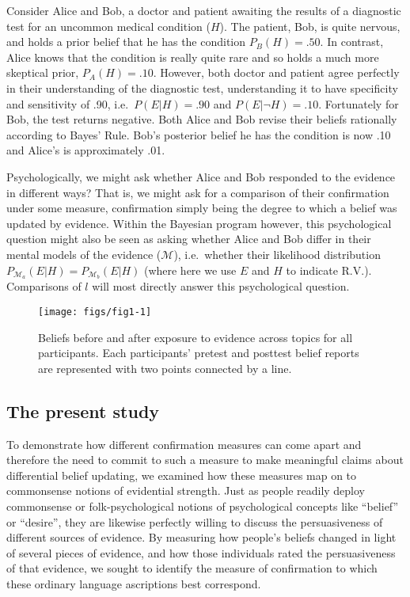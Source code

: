 \documentclass[10pt, letterpaper]{article}
\newenvironment{CodeChunk}{}{}
\begin{document}
Consider Alice and Bob, a doctor and patient awaiting the results of a
diagnostic test for an uncommon medical condition (\(H\)). The patient,
Bob, is quite nervous, and holds a prior belief that he has the
condition \(P_{B}(H) = .50\). In contrast, Alice knows that the
condition is really quite rare and so holds a much more skeptical prior,
\(P_{A}(H) = .10\). However, both doctor and patient agree perfectly in
their understanding of the diagnostic test, understanding it to have
specificity and sensitivity of .90, i.e.~\(P(E|H) = .90\) and
\(P(E| \neg H) =. 10\). Fortunately for Bob, the test returns negative.
Both Alice and Bob revise their beliefs rationally according to Bayes'
Rule. Bob's posterior belief he has the condition is now .10 and Alice's
is approximately .01.

Psychologically, we might ask whether Alice and Bob responded to the
evidence in different ways? That is, we might ask for a comparison of
their confirmation under some measure, confirmation simply being the
degree to which a belief was updated by evidence. Within the Bayesian
program however, this psychological question might also be seen as
asking whether Alice and Bob differ in their mental models of the
evidence (\(\mathcal{M}\)), i.e.~whether their likelihood distribution
\(P_{\mathcal{M}_a}(E|H) = P_{\mathcal{M}_b}(E|H)\) (where here we use
\(E\) and \(H\) to indicate R.V.). Comparisons of \(l\) will most
directly answer this psychological question.

\begin{CodeChunk}
\begin{figure*}[!ht]
\texttt{[image: figs/fig1-1]} \caption[Beliefs before and after exposure to evidence across topics for all participants]{Beliefs before and after exposure to evidence across topics for all participants. Each participants' pretest and posttest belief reports are represented with two points connected by a line.}\label{fig:fig1}
\end{figure*}
\end{CodeChunk}

\hypertarget{the-present-study}{%
\subsection{The present study}\label{the-present-study}}

To demonstrate how different confirmation measures can come apart and
therefore the need to commit to such a measure to make meaningful claims
about differential belief updating, we examined how these measures map
on to commonsense notions of evidential strength. Just as people readily
deploy commonsense or folk-psychological notions of psychological
concepts like ``belief'' or ``desire'', they are likewise perfectly
willing to discuss the persuasiveness of different sources of evidence.
By measuring how people's beliefs changed in light of several pieces of
evidence, and how those individuals rated the persuasiveness of that
evidence, we sought to identify the measure of confirmation to which
these ordinary language ascriptions best correspond.
\end{document}
